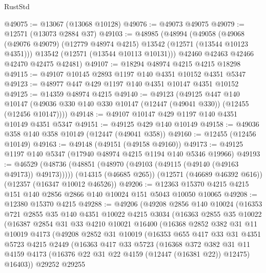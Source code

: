\begin{lexlean}{RustStd}
\begin{coremodule}
@49075 := @13067 (@13068 @10128)
@49076 := @49073 @49075
@49079 := @12571 (@13073 @2884 @37)
@49103 := @48985
    (@48994
      (@49058
        (@49068 (@49076 @49079) (@12779 @48974 @4215) @13542 (@12571 (@13544 @10123 @4351)))
        @13542
        (@12571 (@13544 @10113 @10131)))
      @42460
      @42463
      @42466
      @42470
      @42475
      @42481)
@49107 := @18294 @48974 @4215 @4215 @18298
@49115 := @49107 @10145 @2893 @1197 @140 @4351 @10152 @4351 @5347
@49123 := @48977 @447 @429 @1197 @140 @4351 @10147 @4351 @10152
@49125 := @14359 @48974 @4215
@49140 := @49123
    (@49125
      @447
      @140
      @10147
      (@49036 @330 @140 @330 @10147 (@12447 (@49041 @330)) (@12455 (@12456 @10147))))
@49148 := @49107 @10147 @429 @1197 @140 @4351 @10149 @4351 @5347
@49151 := @49125 @429 @140 @10149
@49158 := @49036 @358 @140 @358 @10149 (@12447 (@49041 @358))
@49160 := @12455 (@12456 @10149)
@49163 := @49148 (@49151 (@49158 @49160))
@49173 := @49125 @1197 @140 @5347 (@17940 @48974 @4215 @1194 @140 @5346 @19966)
@49193 := @46529
    (@48736 (@48851 (@48970 (@49103 (@49115 (@49140 (@49163 @49173)) @49173)))))
    (@14315 (@46685 @265))
    (@12571 (@46689 @46392 @616))
    (@12357 (@16347 @10012 @46526))
@49206 := @12363 @15370 @4215 @4215 @151 @140 @2856 @2866 @140 @10024 @151 @5043 @10050 @10065
@49208 := @12380 @15370 @4215
@49288 := @49206
    (@49208
      @2856
      @140
      @10024
      (@16353
        @721
        @2855
        @35
        @140
        @4351
        @10022
        @4215
        @3034
        (@16363
          @2855
          @35
          @10022
          (@16387
            @2854
            @31
            @33
            @4210
            @10021
            @16400
            (@16368
              @2852
              @382
              @31
              @11
              @10019
              @4173
              (@49208
                @2852
                @31
                @10019
                (@16353
                  @655
                  @417
                  @33
                  @31
                  @4351
                  @5723
                  @4215
                  @2449
                  (@16363
                    @417
                    @33
                    @5723
                    (@16368
                      @372
                      @382
                      @31
                      @11
                      @4159
                      @4173
                      (@16376 @22 @31 @22 @4159 (@12447 (@16381 @22)) @12475)
                      @16403))
                  @29252
                  @29255

\end{coremodule}
\end{lexlean}
